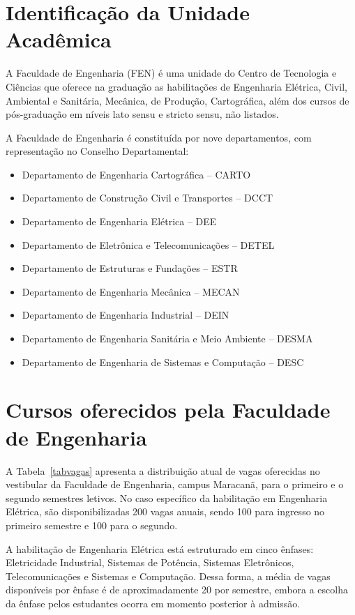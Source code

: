 \section{Identificação da Unidade Acadêmica}

A Faculdade de Engenharia (FEN) é uma unidade do Centro de Tecnologia e Ciências que oferece na graduação as habilitações de Engenharia Elétrica, Civil, Ambiental e Sanitária, Mecânica, de Produção, Cartográfica, além dos cursos de pós-graduação em níveis lato sensu e stricto sensu, não listados.

A Faculdade de Engenharia é constituída por nove departamentos, com representação no Conselho Departamental:

\begin{itemize}
	\item Departamento de Engenharia Cartográfica -- CARTO
	\item Departamento de Construção Civil e Transportes -- DCCT
	\item Departamento de Engenharia Elétrica -- DEE
	\item Departamento de Eletrônica e Telecomunicações -- DETEL
	\item Departamento de Estruturas e Fundações -- ESTR
	\item Departamento de Engenharia Mecânica -- MECAN
	\item Departamento de Engenharia Industrial -- DEIN
	\item Departamento de Engenharia Sanitária e Meio Ambiente -- DESMA
	\item Departamento de Engenharia de Sistemas e Computação -- DESC
\end{itemize}

\section{Cursos oferecidos pela Faculdade de Engenharia}

A Tabela~\ref{tabvagas} apresenta a distribuição atual de vagas oferecidas no vestibular da Faculdade de Engenharia, campus Maracanã, para o primeiro e o segundo semestres letivos. No caso específico da habilitação em Engenharia Elétrica, são disponibilizadas 200 vagas anuais, sendo 100 para ingresso no primeiro semestre e 100 para o segundo.

A habilitação de Engenharia Elétrica está estruturado em cinco ênfases: Eletricidade Industrial, Sistemas de Potência, Sistemas Eletrônicos, Telecomunicações e Sistemas e Computação. Dessa forma, a média de vagas disponíveis por ênfase é de aproximadamente 20 por semestre, embora a escolha da ênfase pelos estudantes ocorra em momento posterior à admissão.


